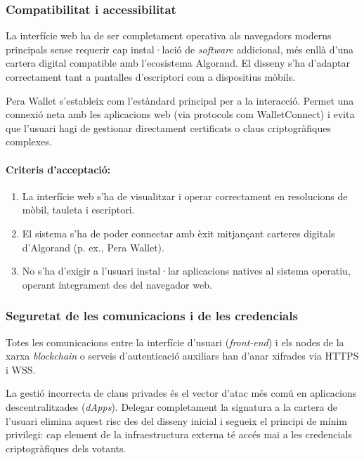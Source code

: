 \subsubsection{Compatibilitat i accessibilitat}

La interfície web ha de ser completament operativa als navegadors moderns principals sense requerir cap instal·lació de \textit{software} addicional, més enllà d'una cartera digital compatible amb l'ecosistema Algorand.
El disseny s'ha d'adaptar correctament tant a pantalles d'escriptori com a dispositius mòbils.

Pera Wallet s'estableix com l'estàndard principal per a la interacció. Permet una connexió neta amb les aplicacions web (via protocols com WalletConnect) i evita que l'usuari hagi de gestionar directament certificats o claus criptogràfiques complexes.

\paragraph{Criteris d'acceptació:}
\begin{enumerate}[label=\roman*.]
    \item La interfície web s'ha de visualitzar i operar correctament en resolucions de mòbil, tauleta i escriptori.
    \item El sistema s'ha de poder connectar amb èxit mitjançant carteres digitals d'Algorand (p. ex., Pera Wallet).
    \item No s'ha d'exigir a l'usuari instal·lar aplicacions natives al sistema operatiu, operant íntegrament des del navegador web.
\end{enumerate}

\subsubsection{Seguretat de les comunicacions i de les credencials}

Totes les comunicacions entre la interfície d'usuari (\textit{front-end}) i els nodes de la xarxa \textit{blockchain} o serveis d'autenticació auxiliars han d'anar xifrades via HTTPS i WSS.

La gestió incorrecta de claus privades és el vector d'atac més comú en aplicacions descentralitzades (\textit{dApps}). 
Delegar completament la signatura a la cartera de l'usuari elimina aquest risc des del disseny inicial i segueix el principi de mínim privilegi: cap element de la infraestructura externa té accés mai a les credencials criptogràfiques dels votants.


